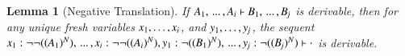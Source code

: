 \documentclass{elsarticle}
\newtheorem{lemma}[theorem]{Lemma}
\begin{document}
\begin{lemma}[Negative Translation]
  \label{lemma:negative_translation}
  If $ \mathit{A_{{\mathrm{1}}}}  , \, ... \, ,  \mathit{A_{\mathit{i}}}  \vdash  \mathit{B_{{\mathrm{1}}}}  , \, ... \, ,  \mathit{B_{\mathit{j}}} $ is derivable, then for any
  unique fresh variables
  $\mathit{x_{{\mathrm{1}}}},\ldots,\mathit{x_{\mathit{i}}}$, and
  $\mathit{y_{{\mathrm{1}}}},\ldots,\mathit{y_{\mathit{j}}}$, the sequent
  $ \mathit{x_{{\mathrm{1}}}}  :   \lnot    \lnot  (   ( \mathit{A_{{\mathrm{1}}}} )^N   )     , \, ... \, ,  \mathit{x_{\mathit{i}}}  :   \lnot    \lnot  (   ( \mathit{A_{\mathit{i}}} )^N   )     ,  \mathit{y_{{\mathrm{1}}}}  :   \lnot  (   ( \mathit{B_{{\mathrm{1}}}} )^N   )   , \, ... \, ,  \mathit{y_{\mathit{j}}}  :   \lnot  (   ( \mathit{B_{\mathit{j}}} )^N   )   \vdash   \cdot  $
  is derivable.
\end{lemma}
\end{document}
